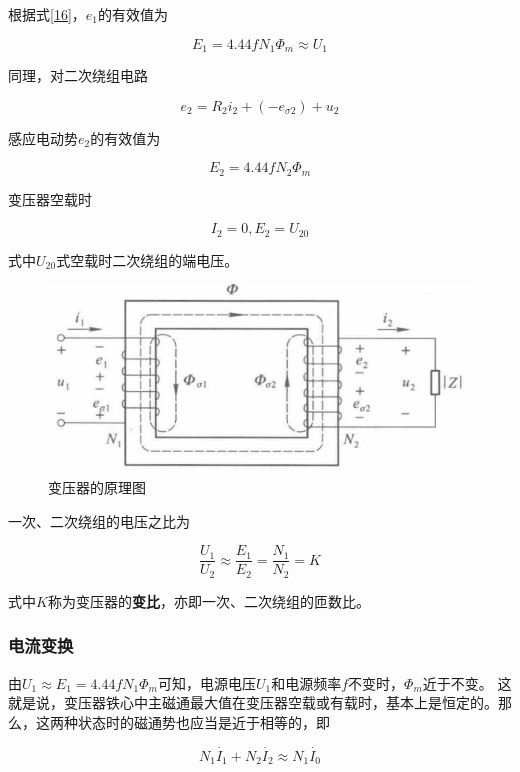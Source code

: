 \documentclass[12pt]{article}
\begin{document}
根据式\ref{16}，\(e_1\)的有效值为

\begin{equation}
    E_1 = 4.44 f N_1 \Phi_m \approx U_1
\end{equation}

同理，对二次绕组电路

\begin{equation}
    e_2 = R_2 i_2 + (-e_{\sigma 2}) + u_2
\end{equation}

感应电动势\(e_2\)的有效值为

\begin{equation}
    E_2 = 4.44 f N_2 \Phi_m
\end{equation}

变压器空载时

\begin{equation}
    I_2=0, E_2 = U_{20}
\end{equation}

式中\(U_{20}\)式空载时二次绕组的端电压。

\begin{figure}[!h]
    \centering
    \includegraphics[width = .4\textwidth]{graphics/Screenshot 2025-09-13 at 00.57.19.png}
    \caption{变压器的原理图}
    \label{变压器的原理图}
\end{figure}

一次、二次绕组的电压之比为

\begin{equation}
    \frac{U_1}{U_2} \approx \frac{E_1}{E_2} = \frac{N_1}{N_2} = K
    \label{25}
\end{equation}

式中\(K\)称为变压器的\textbf{变比}，亦即一次、二次绕组的匝数比。

\subsubsection{电流变换}

由\(U_1 \approx E_1 = 4.44 f N_1 \Phi_m\)可知，电源电压\(U_1\)和电源频率\(f\)不变时，\(\Phi_m\)近于不变。
这就是说，变压器铁心中主磁通最大值在变压器空载或有载时，基本上是恒定的。那么，这两种状态时的磁通势也应当是近于相等的，即

\begin{equation}
    N_1 \dot{I_1} + N_2 \dot{I_2} \approx N_1 \dot{I_0}
\end{equation}
\end{document}
